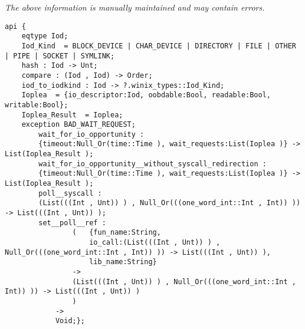 \label{api:Winix\_Io\_\_Premicrothread}

{\tiny \it The above information is manually maintained and may contain errors.}
\begin{verbatim}
api {
    eqtype Iod;
    Iod_Kind  = BLOCK_DEVICE | CHAR_DEVICE | DIRECTORY | FILE | OTHER | PIPE | SOCKET | SYMLINK;
    hash : Iod -> Unt;
    compare : (Iod , Iod) -> Order;
    iod_to_iodkind : Iod -> ?.winix_types::Iod_Kind;
    Ioplea  = {io_descriptor:Iod, oobdable:Bool, readable:Bool, writable:Bool};
    Ioplea_Result  = Ioplea;
    exception BAD_WAIT_REQUEST;
        wait_for_io_opportunity :
        {timeout:Null_Or(time::Time ), wait_requests:List(Ioplea )} -> List(Ioplea_Result );
        wait_for_io_opportunity__without_syscall_redirection :
        {timeout:Null_Or(time::Time ), wait_requests:List(Ioplea )} -> List(Ioplea_Result );
        poll__syscall :
        (List(((Int , Unt)) ) , Null_Or(((one_word_int::Int , Int)) )) -> List(((Int , Unt)) );
        set__poll__ref :
                (   {fun_name:String,
                    io_call:(List(((Int , Unt)) ) , Null_Or(((one_word_int::Int , Int)) )) -> List(((Int , Unt)) ),
                    lib_name:String}
                ->
                (List(((Int , Unt)) ) , Null_Or(((one_word_int::Int , Int)) )) -> List(((Int , Unt)) )
                )
            ->
            Void;};
\end{verbatim}
